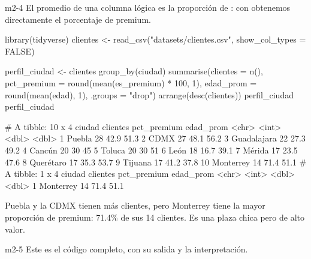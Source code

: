 \begin{solucion}{m2-4}
El promedio de una columna lógica es la proporción de : con
 obtenemos directamente el porcentaje de premium.
\end{solucion}

\begin{rcode}
library(tidyverse)
clientes <- read_csv("datasets/clientes.csv", show_col_types = FALSE)

perfil_ciudad <- clientes %
  group_by(ciudad) %
  summarise(clientes    = n(),
            pct_premium = round(mean(es_premium) * 100, 1),
            edad_prom   = round(mean(edad), 1),
            .groups = "drop") %
  arrange(desc(clientes))
perfil_ciudad
perfil_ciudad %
\end{rcode}
\begin{rsalida}
# A tibble: 10 x 4
   ciudad      clientes pct_premium edad_prom
   <chr>          <int>       <dbl>     <dbl>
 1 Puebla            28        42.9      51.3
 2 CDMX              27        48.1      56.2
 3 Guadalajara       22        27.3      49.2
 4 Cancún            20        30        45  
 5 Toluca            20        30        51  
 6 León              18        16.7      39.1
 7 Mérida            17        23.5      47.6
 8 Querétaro         17        35.3      53.7
 9 Tijuana           17        41.2      37.8
10 Monterrey         14        71.4      51.1
# A tibble: 1 x 4
  ciudad    clientes pct_premium edad_prom
  <chr>        <int>       <dbl>     <dbl>
1 Monterrey       14        71.4      51.1
\end{rsalida}

Puebla y la CDMX tienen más clientes, pero Monterrey tiene la mayor
proporción de premium: 71.4\% de sus 14 clientes. Es una plaza chica pero de
alto valor.


\begin{solucion}{m2-5}
Este es el código completo, con su salida y la interpretación.
\end{solucion}

